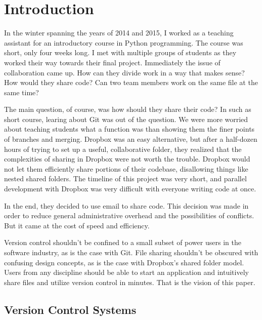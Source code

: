 \chapter{Introduction}

In the winter spanning the years of 2014 and 2015, I worked as a teaching assistant for an introductory course in Python programming. The course was short, only four weeks long. I met with multiple groups of students as they worked their way towards their final project. Immediately the issue of collaboration came up. How can they divide work in a way that makes sense? How would they share code? Can two team members work on the same file at the same time?

The main question, of course, was how should they share their code? In such as short course, learing about Git was out of the question. We were more worried about teaching students what a function was than showing them the finer points of branches and merging. Dropbox was an easy alternative, but after a half-dozen hours of trying to set up a useful, collaborative folder, they realized that the complexities of sharing in Dropbox were not worth the trouble. Dropbox would not let them efficiently share portions of their codebase, disallowing things like nested shared folders. The timeline of this project was very short, and parallel development with Dropbox was very difficult with everyone writing code at once. 

In the end, they decided to use email to share code. This decision was made in order to reduce general administrative overhead and the possibilities of conflicts. But it came at the cost of speed and efficiency.

Version control shouldn't be confined to a small subset of power users in the software industry, as is the case with Git. File sharing shouldn't be obscured with confusing design concepts, as is the case with Dropbox's shared folder model. Users from any discipline should be able to start an application and intuitively share files and utilize version control in minutes. That is the vision of this paper.

\section{Version Control Systems}

